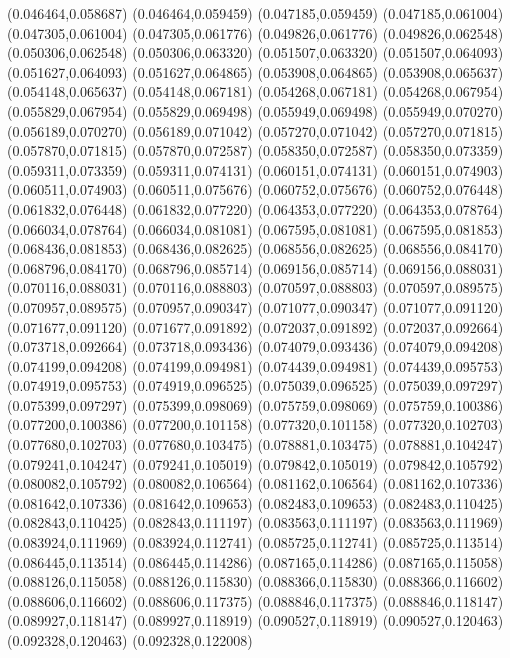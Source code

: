 (0.046464,0.058687)
(0.046464,0.059459)
(0.047185,0.059459)
(0.047185,0.061004)
(0.047305,0.061004)
(0.047305,0.061776)
(0.049826,0.061776)
(0.049826,0.062548)
(0.050306,0.062548)
(0.050306,0.063320)
(0.051507,0.063320)
(0.051507,0.064093)
(0.051627,0.064093)
(0.051627,0.064865)
(0.053908,0.064865)
(0.053908,0.065637)
(0.054148,0.065637)
(0.054148,0.067181)
(0.054268,0.067181)
(0.054268,0.067954)
(0.055829,0.067954)
(0.055829,0.069498)
(0.055949,0.069498)
(0.055949,0.070270)
(0.056189,0.070270)
(0.056189,0.071042)
(0.057270,0.071042)
(0.057270,0.071815)
(0.057870,0.071815)
(0.057870,0.072587)
(0.058350,0.072587)
(0.058350,0.073359)
(0.059311,0.073359)
(0.059311,0.074131)
(0.060151,0.074131)
(0.060151,0.074903)
(0.060511,0.074903)
(0.060511,0.075676)
(0.060752,0.075676)
(0.060752,0.076448)
(0.061832,0.076448)
(0.061832,0.077220)
(0.064353,0.077220)
(0.064353,0.078764)
(0.066034,0.078764)
(0.066034,0.081081)
(0.067595,0.081081)
(0.067595,0.081853)
(0.068436,0.081853)
(0.068436,0.082625)
(0.068556,0.082625)
(0.068556,0.084170)
(0.068796,0.084170)
(0.068796,0.085714)
(0.069156,0.085714)
(0.069156,0.088031)
(0.070116,0.088031)
(0.070116,0.088803)
(0.070597,0.088803)
(0.070597,0.089575)
(0.070957,0.089575)
(0.070957,0.090347)
(0.071077,0.090347)
(0.071077,0.091120)
(0.071677,0.091120)
(0.071677,0.091892)
(0.072037,0.091892)
(0.072037,0.092664)
(0.073718,0.092664)
(0.073718,0.093436)
(0.074079,0.093436)
(0.074079,0.094208)
(0.074199,0.094208)
(0.074199,0.094981)
(0.074439,0.094981)
(0.074439,0.095753)
(0.074919,0.095753)
(0.074919,0.096525)
(0.075039,0.096525)
(0.075039,0.097297)
(0.075399,0.097297)
(0.075399,0.098069)
(0.075759,0.098069)
(0.075759,0.100386)
(0.077200,0.100386)
(0.077200,0.101158)
(0.077320,0.101158)
(0.077320,0.102703)
(0.077680,0.102703)
(0.077680,0.103475)
(0.078881,0.103475)
(0.078881,0.104247)
(0.079241,0.104247)
(0.079241,0.105019)
(0.079842,0.105019)
(0.079842,0.105792)
(0.080082,0.105792)
(0.080082,0.106564)
(0.081162,0.106564)
(0.081162,0.107336)
(0.081642,0.107336)
(0.081642,0.109653)
(0.082483,0.109653)
(0.082483,0.110425)
(0.082843,0.110425)
(0.082843,0.111197)
(0.083563,0.111197)
(0.083563,0.111969)
(0.083924,0.111969)
(0.083924,0.112741)
(0.085725,0.112741)
(0.085725,0.113514)
(0.086445,0.113514)
(0.086445,0.114286)
(0.087165,0.114286)
(0.087165,0.115058)
(0.088126,0.115058)
(0.088126,0.115830)
(0.088366,0.115830)
(0.088366,0.116602)
(0.088606,0.116602)
(0.088606,0.117375)
(0.088846,0.117375)
(0.088846,0.118147)
(0.089927,0.118147)
(0.089927,0.118919)
(0.090527,0.118919)
(0.090527,0.120463)
(0.092328,0.120463)
(0.092328,0.122008)
